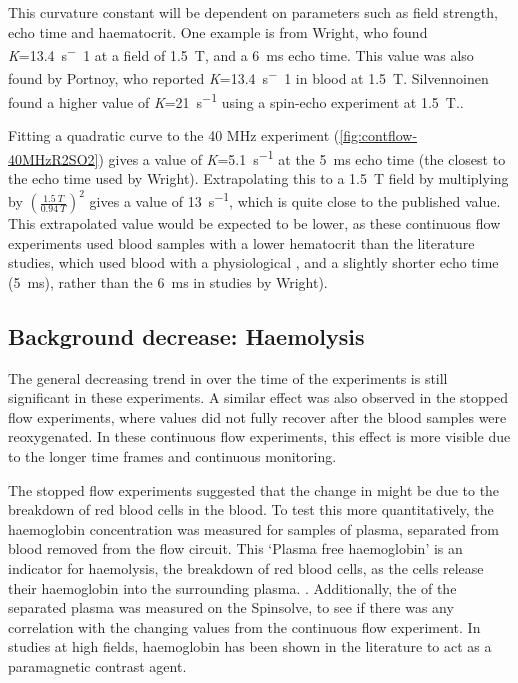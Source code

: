 This curvature constant will be dependent on parameters such as field strength, echo time and haematocrit.
One example is from Wright, who found \textit{K}=\SI{13.4}{s^-1} at a field of \SI{1.5}{T}, and a \SI{6}{ms} echo time\cite{WrightEstimatingoxygensaturation1991}.
This value was also found by Portnoy, who reported \textit{K}=\SI{13.4}{s^-1} in blood at \SI{1.5}{T}\cite{PortnoyRelaxationpropertieshuman2017}.
Silvennoinen found a higher value of \textit{K}=\SI{21}{s^{-1}} using a spin-echo experiment at \SI{1.5}{T}.\cite{SilvennoinenComparisondependenceblood2003}.

Fitting a quadratic curve to the 40 MHz experiment (\autoref{fig:contflow-40MHzR2SO2}) gives a value of \textit{K}=\SI{5.1}{s^{-1}} at the \SI{5}{ms} echo time (the closest to the echo time used by Wright).
Extrapolating this to a \SI{1.5}{T} field by multiplying by $(\frac{\SI{1.5}{T}}{\SI{0.94}{T}})^2$ gives a value of \SI{13}{s^{-1}}, which is quite close to the published value.
This extrapolated value would be expected to be lower, as these continuous flow experiments used blood samples with a lower hematocrit than the literature studies, which used blood with a physiological \Hct, and a slightly shorter echo time (\SI{5}{ms}), rather than the \SI{6}{ms} in studies by Wright).

\subsection{Background \Ttwo decrease: Haemolysis}
\label{sec:contflow-hemolysis}
The general decreasing trend in \Ttwo over the time of the experiments is still significant in these experiments.
A similar effect was also observed in the stopped flow experiments, where \Ttwo values did not fully recover after the blood samples were reoxygenated.
In these continuous flow experiments, this effect is more visible due to the longer time frames and continuous monitoring.

The stopped flow experiments suggested that the change in \Ttwo might be due to the breakdown of red blood cells in the blood.
To test this more quantitatively, the haemoglobin concentration was measured for samples of plasma, separated from blood removed from the flow circuit.
This `Plasma free haemoglobin' is an indicator for haemolysis, the breakdown of red blood cells, as the cells release their haemoglobin into the surrounding plasma. \cite{MalinauskasPlasmaHemoglobinMeasurement1997}.
Additionally, the \Ttwo of the separated plasma was measured on the Spinsolve, to see if there was any correlation with the changing \Ttwo values from the continuous flow experiment.
In studies at high fields, haemoglobin has been shown in the literature to act as a paramagnetic contrast agent\cite{GrgacTransversewaterrelaxation2017}.

